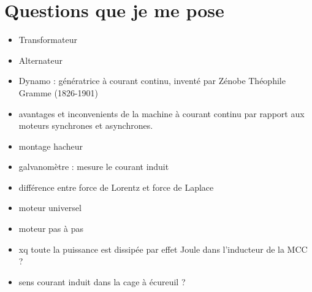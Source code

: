 \documentclass{article}
\begin{document}
\section*{Questions que je me pose}
\begin{itemize}
    \item Transformateur
    \item Alternateur
    \item Dynamo : génératrice à courant continu, inventé par Zénobe Théophile Gramme (1826-1901)
    \item avantages et inconvenients de la machine à courant continu par rapport aux moteurs synchrones et asynchrones.
    \item montage hacheur
    \item galvanomètre : mesure le courant induit
    \item différence entre force de Lorentz et force de Laplace
    \item moteur universel
    \item moteur pas à pas
    \item xq toute la puissance est dissipée par effet Joule dans l'inducteur de la MCC ? 
    \item sens courant induit dans la cage à écureuil ? 
\end{itemize}
\end{document}
